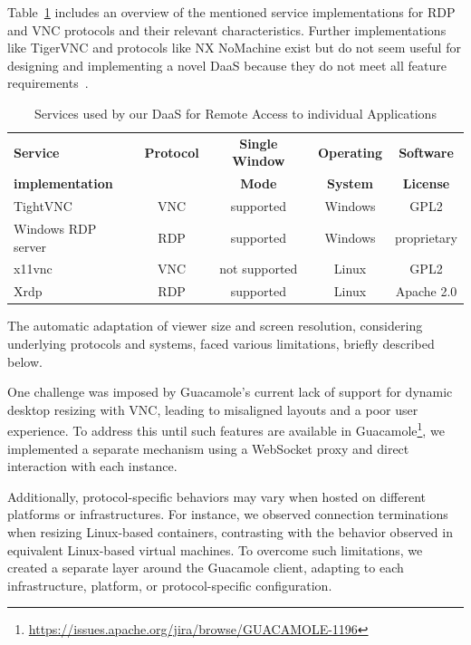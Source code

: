 \documentclass[runningheads]{llncs}
\begin{document}
Table~\ref{tab:DaaS_Services_Overview} includes an overview
of the mentioned service implementations for RDP and VNC protocols
and their relevant characteristics.
Further implementations like TigerVNC and protocols like NX NoMachine exist
but do not seem useful for designing and implementing a novel DaaS because
they do not meet all feature requirements~\cite{OJCC_2023v8i1n01_Baun}.

\begin{table}
	\centering
	\caption{Services used by our DaaS for Remote Access to individual Applications}
	\begin{tabular}{|l|c|c|c|c|}
		\hline
		\textbf{Service}        & \textbf{Protocol} & \textbf{Single Window} & \textbf{Operating} & \textbf{Software} \\
		\textbf{implementation} &                   & \textbf{Mode}          & \textbf{System}    & \textbf{License}  \\
		\hline
		TightVNC                & VNC               & supported              & Windows            & GPL2              \\
		\hline
		Windows RDP server      & RDP               & supported              & Windows            & proprietary       \\
		\hline
		x11vnc                  & VNC               & not supported          & Linux              & GPL2              \\
		\hline
		Xrdp                    & RDP               & supported              & Linux              & Apache 2.0        \\
		\hline
	\end{tabular}
	\label{tab:DaaS_Services_Overview}
\end{table}

The automatic adaptation of viewer size and screen resolution,
considering underlying protocols and systems,
faced various limitations, briefly described below.

One challenge was imposed by Guacamole's current lack of support
for dynamic desktop resizing with VNC,
leading to misaligned layouts and a poor user experience.
To address this until such features are available in
Guacamole\footnote{\url{https://issues.apache.org/jira/browse/GUACAMOLE-1196}},
we implemented a separate mechanism using a WebSocket proxy
and direct interaction with each instance.

Additionally, protocol-specific behaviors may vary
when hosted on different platforms or infrastructures.
For instance, we observed connection terminations when resizing Linux-based containers,
contrasting with the behavior observed in equivalent Linux-based virtual machines.
To overcome such limitations, we created a separate layer around the Guacamole client,
adapting to each infrastructure, platform, or protocol-specific configuration.
\end{document}
